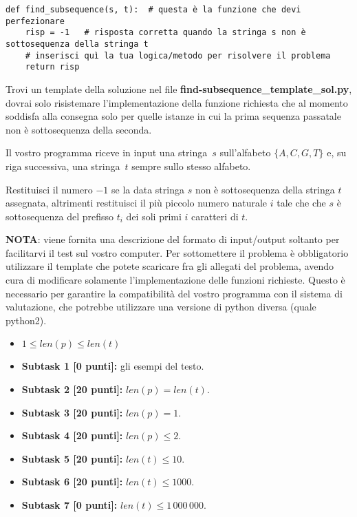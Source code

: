 \begin{verbatim}
def find_subsequence(s, t):  # questa è la funzione che devi perfezionare
    risp = -1   # risposta corretta quando la stringa s non è sottosequenza della stringa t
    # inserisci quì la tua logica/metodo per risolvere il problema
    return risp
\end{verbatim}

Trovi un template della soluzione nel file \textbf{find-subsequence\_template\_sol.py}, 
dovrai solo risistemare l'implementazione della funzione richiesta che al momento soddisfa 
alla consegna solo per quelle istanze in cui la prima sequenza passatale non è sottosequenza della seconda.

\InputFile
Il vostro programma riceve in input una stringa~$s$ sull'alfabeto $\{A,C,G,T\}$ e, 
su riga successiva, una stringa~$t$ sempre sullo stesso alfabeto. 

\OutputFile
Restituisci il numero $-1$ se la data stringa $s$ non è sottosequenza della stringa 
$t$ assegnata, altrimenti restituisci il più piccolo numero naturale $i$ tale che 
che $s$ è sottosequenza del prefisso $t_i$ dei soli primi $i$ caratteri di $t$.

\textbf{NOTA}: viene fornita una descrizione del formato di input/output soltanto 
per facilitarvi il test sul vostro computer. Per sottomettere il problema è obbligatorio 
utilizzare il template che potete scaricare fra gli allegati del problema, avendo 
cura di modificare solamente l'implementazione delle funzioni richieste. Questo 
è necessario per garantire la compatibilità del vostro programma con il sistema 
di valutazione, che potrebbe utilizzare una versione di python diversa (quale python2).

\Examples
\begin{example}
%
%
%
\end{example}

\Constraints
\begin{itemize}[nolistsep, noitemsep]
  \item $1\leq len(p) \leq len(t)$
\end{itemize}

\Scoring
  \begin{itemize}
    \item \textbf{Subtask 1 [0 punti]:} gli esempi del testo.
    \item \textbf{Subtask 2 [20 punti]:} $len(p) = len(t)$.
    \item \textbf{Subtask 3 [20 punti]:} $len(p) = 1$.
    \item \textbf{Subtask 4 [20 punti]:} $len(p) \le 2$.
    \item \textbf{Subtask 5 [20 punti]:} $len(t) \le 10$.
    \item \textbf{Subtask 6 [20 punti]:} $len(t) \le 1000$.
    \item \textbf{Subtask 7 [0 punti]:} $len(t) \le 1\,000\,000$.
  \end{itemize}
